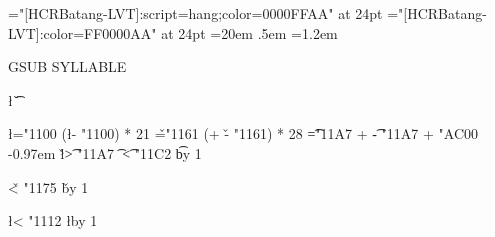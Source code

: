 \ifx\directlua\undefined\else \fi
\ifx\testfontname\undefined
    \def\testfontname{HCRBatang-LVT}\fi
\font\hcrgsub="[\testfontname]:script=hang;color=0000FFAA" at 24pt
\font\hcrsyll="[\testfontname]:color=FF0000AA" at 24pt
\hcrsyll
\hsize=20em \parindent0pt \parskip.5em
\baselineskip=1.2em
\raggedbottom \raggedright \hfuzz\maxdimen
{}


\hcrgsub GSUB \hcrsyll SYLLABLE

\newcount\l
\newcount\v
\newcount\t
\newcount\cho
\newcount\chojung

\def\jongsong{%
    \begingroup
    \t="11A7 %
    \loop
	\hcrsyll \char\numexpr \chojung + \t - "11A7 + "AC00 \relax
	\kern-0.97em
	\hcrgsub \char\l \char\v \ifnum\t > "11A7 \char\t \fi
	\space
    \ifnum\t < "11C2 \advance\t by 1 \repeat
    \endgroup
}
\def\jungsong{%
    \begingroup
    \v="1161
    \loop
	\chojung\numexpr (\cho + \v - "1161) * 28 \relax
	\jongsong
    \ifnum\v < "1175 \advance\v by 1 \repeat
    \endgroup
}

\l="1100
\loop
    \cho\numexpr (\l - "1100) * 21 \relax
    \jungsong
    \endgraf
\ifnum\l < "1112 \advance\l by 1 \repeat

\bye
